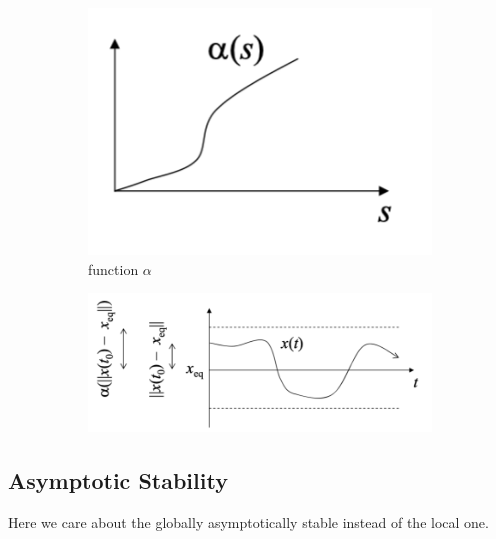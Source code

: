 \documentclass{article}
\begin{document}
\begin{figure}[H]
     \centering
     \begin{subfigure}[b]{0.3\textwidth}
         \centering
         \includegraphics[width=\textwidth]{Figs/3.png}
         \caption{function $\alpha$}
     \end{subfigure}
     \hfill
     \begin{subfigure}[b]{0.47\textwidth}
         \centering
         \includegraphics[width=\textwidth]{Figs/4.png}
     \end{subfigure}
\end{figure}

\subsection{Asymptotic Stability}
Here we care about the globally asymptotically stable instead of the local one.
\end{document}
